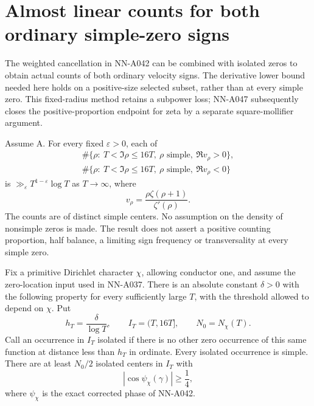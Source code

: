 \section{Almost linear counts for both ordinary simple-zero signs}
\label{sec:A045-simple-signs}

The weighted cancellation in NN-A042 can be combined with
isolated zeros to obtain actual counts of both ordinary
velocity signs. The derivative lower bound needed here holds
on a positive-size selected subset, rather than at every
simple zero. This fixed-radius method retains a subpower loss;
NN-A047 subsequently closes the positive-proportion endpoint
for zeta by a separate square-mollifier argument.

\begin{theorem}
\label{thm:A045-simple-signs}
Assume A. For every fixed \(\varepsilon>0\), each of
\[
 \begin{aligned}
 \#\{\rho:\ T<\Im\rho\le16T,\ \rho\text{ simple},
                                      \ \Re v_\rho>0\},\\
 \#\{\rho:\ T<\Im\rho\le16T,\ \rho\text{ simple},
                                      \ \Re v_\rho<0\}
 \end{aligned}
\]
is \(\gg_\varepsilon T^{1-\varepsilon}\log T\) as
\(T\to\infty\), where
\[
            v_\rho=\frac{\rho\zeta(\rho+1)}{\zeta'(\rho)}.
\]
The counts are of distinct simple centers. No assumption on
the density of nonsimple zeros is made.
The result does not assert a positive counting proportion,
half balance, a limiting sign frequency or transversality
at every simple zero.
\end{theorem}

\begin{lemma}
\label{lem:A045-isolated-phase}
Fix a primitive Dirichlet character \(\chi\), allowing
conductor one, and assume the zero-location input used in
NN-A037. There is an absolute constant \(\delta>0\) with the
following property for every sufficiently large \(T\), with
the threshold allowed to depend on \(\chi\).
Put
\[
 h_T=\frac{\delta}{\log T},\qquad
 I_T=(T,16T],\qquad N_0=N_\chi(T).
\]
Call an occurrence in \(I_T\) isolated if there is no other
zero occurrence of this same function at distance less than
\(h_T\) in ordinate. Every isolated occurrence is simple.
There are at least \(N_0/2\) isolated centers in \(I_T\) with
\[
                 |\cos\psi_\chi(\gamma)|\ge\frac14,
\]
where \(\psi_\chi\) is the exact corrected phase of NN-A042.
\end{lemma}

